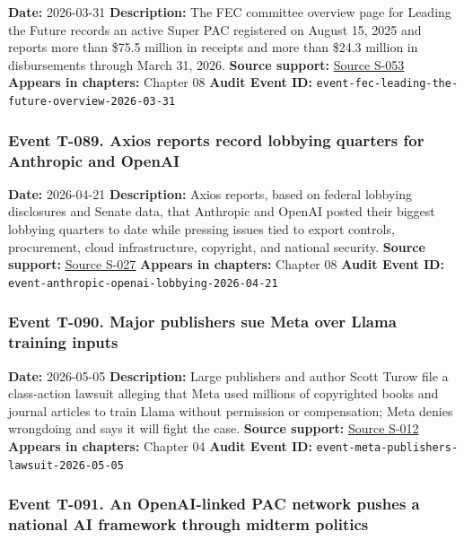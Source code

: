 \documentclass[
  american,
  11pt,
  letterpaper,
]{article}
\begin{document}
\textbf{Date:} 2026-03-31 \textbf{Description:} The FEC committee
overview page for Leading the Future records an active Super PAC
registered on August 15, 2025 and reports more than \$75.5 million in
receipts and more than \$24.3 million in disbursements through March 31,
2026. \textbf{Source support:}
\hyperref[source-s-053-leading-the-future-committee-overview]{Source
S-053} \textbf{Appears in chapters:} Chapter 08 \textbf{Audit Event ID:}
\texttt{event-fec-leading-the-future-overview-2026-03-31}

\subsubsection{Event T-089. Axios reports record lobbying quarters for
Anthropic and
OpenAI}\label{event-t-089-axios-reports-record-lobbying-quarters-for-anthropic-and-openai}

\textbf{Date:} 2026-04-21 \textbf{Description:} Axios reports, based on
federal lobbying disclosures and Senate data, that Anthropic and OpenAI
posted their biggest lobbying quarters to date while pressing issues
tied to export controls, procurement, cloud infrastructure, copyright,
and national security. \textbf{Source support:}
\hyperref[source-s-027-anthropic-outspends-openai-in-biggest-ever-lobbying-quarter]{Source
S-027} \textbf{Appears in chapters:} Chapter 08 \textbf{Audit Event ID:}
\texttt{event-anthropic-openai-lobbying-2026-04-21}

\subsubsection{Event T-090. Major publishers sue Meta over Llama
training
inputs}\label{event-t-090-major-publishers-sue-meta-over-llama-training-inputs}

\textbf{Date:} 2026-05-05 \textbf{Description:} Large publishers and
author Scott Turow file a class-action lawsuit alleging that Meta used
millions of copyrighted books and journal articles to train Llama
without permission or compensation; Meta denies wrongdoing and says it
will fight the case. \textbf{Source support:}
\hyperref[source-s-012-mark-zuckerberg-personally-authorized-meta-s-copyright-infringement-publishers-allege]{Source
S-012} \textbf{Appears in chapters:} Chapter 04 \textbf{Audit Event ID:}
\texttt{event-meta-publishers-lawsuit-2026-05-05}

\subsubsection{Event T-091. An OpenAI-linked PAC network pushes a
national AI framework through midterm
politics}\label{event-t-091-an-openai-linked-pac-network-pushes-a-national-ai-framework-through-midterm-politics}
\end{document}

